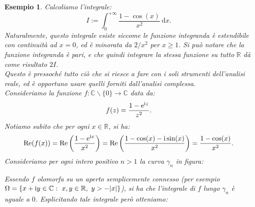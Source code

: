 \documentclass[11pt]{book}
\theoremstyle{Definizione}
\theoremstyle{TeoremaProposizioneLemmaCorollarioCongettura}
\theoremstyle{OsservazioneNotaEsempio}
\newtheorem{myes}{Esempio}[section]
\newcommand{\R}{\mathbb{R}}
\newcommand{\C}{\mathbb{C}}
\newcommand{\tolto}{\smallsetminus}
\renewcommand{\Re}{\textup{Re}}
\renewcommand{\i}{\textup{i}}
\newcommand{\e}{\textup{e}}
\renewcommand{\d}{\mathrm{d}}
\newcommand{\dx}{\,\d x}
\newcommand{\frecciaIn}{
\tikz \draw[-latex] (-1pt,0) -- (1pt,0);
}
\newcommand{\frecciaOut}{
\tikz \draw[latex-] (-1pt,0) -- (1pt,0);
}
\begin{document}
\begin{myes}
Calcoliamo l'integrale:
$$
I := \int_{0}^{+\infty} \frac{1-\cos(x)}{x^2}\dx.
$$
Naturalmente, questo integrale esiste siccome le funzione integranda è estendibile con continuità ad $x = 0$, ed è minorata da $2/x^2$ per $x \geq 1$. Si può notare che la funzione integranda è pari, e che quindi integrare la stessa funzione su tutto $\R$ dà come risultato $2I$.\\
Questo è pressoché tutto ciò che si riesce a fare con i soli strumenti dell'analisi reale, ed è opportuno usare quelli forniti dall'analisi complessa.\\
Consideriamo la funzione $f:\C\tolto\{0\}\longrightarrow \C$ data da:
$$
f(z) = \frac{1-\e^{\i z}}{z^2}.
$$
Notiamo subito che per ogni $x\in \R$, si ha:
$$
\Re(f(x)) = \Re\left(\frac{1-\e^{\i x}}{x^2}\right) = \Re\left(\frac{1-\cos(x)-\i\sin(x)}{x^2}\right) = \frac{1-\cos(x)}{x^2}.
$$
Consideriamo per ogni intero positivo $n > 1$ la curva $\gamma_n$ in figura:
\begin{center}
\end{center}
Essendo $f$ olomorfa su un aperto semplicemente connesso (per esempio $\Omega = \{x+\i y\in \C:\ x,y\in \R,\ y > -|x|\}$), si ha che l'integrale di $f$ lungo $\gamma_n$ è uguale a $0$. Esplicitando tale integrale però otteniamo:

\end{myes}
\end{document}
